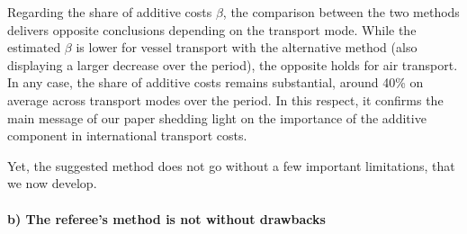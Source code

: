 \documentclass[a4paper,11pt]{article}
\begin{document}
Regarding the share of additive costs $\beta$, the comparison between the two methods delivers opposite conclusions depending on the transport mode. While the estimated $\beta$ is lower for vessel transport with the alternative method (also displaying a larger decrease over the period), the opposite holds for air transport. In any case, the share of additive costs remains substantial, around 40\% on average across transport modes over the period. In this respect, it confirms the main message of our paper shedding light on the importance of the additive component in international transport costs.

Yet, the suggested method does not go without a few important limitations, that we now develop.


\paragraph{b) The referee's method is not without drawbacks}
\end{document}
